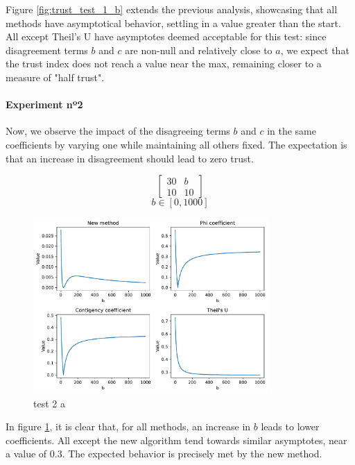 Figure \ref{fig:trust_test_1_b} extends the previous analysis, showcasing that all methods have asymptotical behavior, settling in a value greater than the start. All except Theil's U have asymptotes deemed acceptable for this test: since disagreement terms $b$ and $c$ are non-null and relatively close to $a$, we expect that the trust index does not reach a value near the max, remaining closer to a measure of "half trust".

\paragraph{Experiment nº2} Now, we observe the impact of the disagreeing terms $b$ and $c$ in the same coefficients by varying one while maintaining all others fixed. The expectation is that an increase in disagreement should lead to zero trust.

$$
\begin{bmatrix}
    30 & b \\ 10 & 10
\end{bmatrix}
$$
$$
b \in [0, 1000]
$$
\begin{figure}[h!]
\centering
    \includegraphics[width=0.8\textwidth]{figures/chapter4/cell/trust_tests/2_a.pdf}
    \caption{test 2 a}
    \label{fig:trust_test_2_a}
\end{figure}
\FloatBarrier

In figure \ref{fig:trust_test_2_a}, it is clear that, for all methods, an increase in $b$ leads to lower coefficients. All except the new algorithm tend towards similar asymptotes, near a value of 0.3. The expected behavior is precisely met by the new method.

